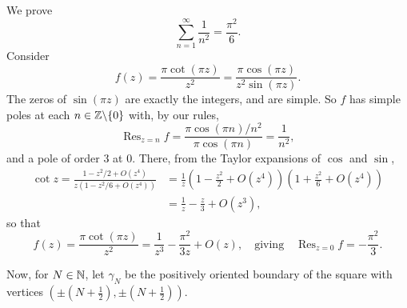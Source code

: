 \documentclass[a4paper]{scrartcl}
\begin{document}
\begin{example}
    We prove
    $$
    \sum_{n = 1}^{\infty} \frac{1}{n^2} = \frac{\pi^2}{6}.
    $$
    Consider
    $$
    f(z) = \frac{\pi \cot(\pi z)}{z^2} = \frac{\pi \cos(\pi z)}{z^2 \sin(\pi z)}.
    $$
    The zeros of $\sin(\pi z)$ are exactly the integers, and are simple. So $f$ has simple poles at each $n \in \mathbb{Z} \backslash \{0\}$ with, by our rules,
    $$
    \operatorname{Res}_{z = n} f = \frac{\pi \cos(\pi n)/n^2}{\pi \cos(\pi n)} = \frac{1}{n^2},
    $$
    and a pole of order 3 at $0$. There, from the Taylor expansions of $\cos$ and $\sin$,
    \begin{align*}
    \cot z = \frac{1 - z^2/2 + O(z^4)}{z(1 - z^2/6 + O(z^4))} &= \frac{1}{z}\left(1 - \frac{z^2}{2} + O(z^4)\right)\left(1 + \frac{z^2}{6} + O(z^4)\right) \\
    &= \frac{1}{z} - \frac{z}{3} + O(z^3),
    \end{align*}
    so that
    $$
    f(z) = \frac{\pi \cot (\pi z)}{z^2} = \frac{1}{z^3} - \frac{\pi^2}{3z} + O(z), \quad \text{giving} \quad \operatorname{Res}_{z = 0} f = -\frac{\pi^2}{3}.
    $$

    Now, for $N \in \mathbb{N}$, let $\gamma_N$ be the positively oriented boundary of the square with vertices $(\pm(N + \tfrac{1}{2}), \pm(N + \tfrac{1}{2}))$.

    \begin{center}
    \end{center}


\end{example}
\end{document}
